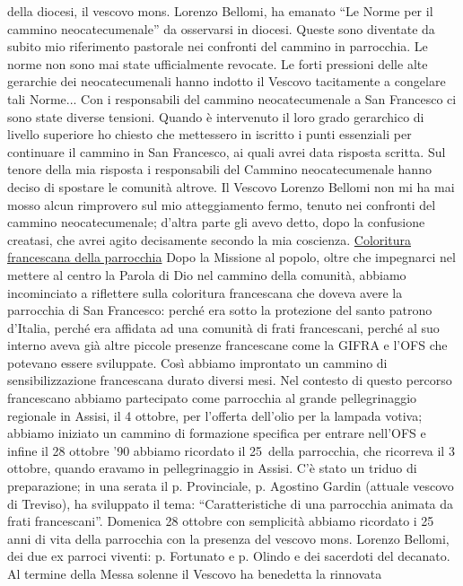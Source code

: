 della diocesi, il vescovo mons. Lorenzo Bellomi, ha emanato “Le Norme per il cammino 
neocatecumenale” da osservarsi in diocesi. Queste sono diventate da subito mio riferimento 
pastorale nei confronti del cammino in parrocchia. Le norme non sono mai state ufficialmente 
revocate. Le forti pressioni delle alte gerarchie dei neocatecumenali hanno indotto il Vescovo 
tacitamente a congelare tali Norme...
Con i responsabili del cammino neocatecumenale a San Francesco ci sono state diverse tensioni. 
Quando è intervenuto il loro grado gerarchico di livello superiore ho chiesto che mettessero in 
iscritto i punti essenziali per continuare il cammino in San Francesco, ai quali avrei data risposta 
scritta. Sul tenore della mia risposta i responsabili del Cammino neocatecumenale hanno deciso di 
spostare le comunità altrove. Il Vescovo Lorenzo Bellomi non mi ha mai mosso alcun rimprovero 
sul mio atteggiamento fermo, tenuto nei confronti del cammino neocatecumenale; d'altra parte gli 
avevo detto, dopo la confusione creatasi, che avrei agito decisamente secondo la mia coscienza.
\bigbreak
{}
\underline{Coloritura francescana della parrocchia}
\medbreak
Dopo la Missione al popolo, oltre che impegnarci nel mettere al centro la Parola di Dio nel 
cammino della comunità, abbiamo incominciato a riflettere sulla coloritura francescana che doveva 
avere la parrocchia di San Francesco: perché era sotto la protezione del santo patrono d'Italia,  
perché era affidata ad una comunità di frati francescani, perché al suo interno aveva già altre piccole 
presenze francescane come la GIFRA e l'OFS che potevano essere sviluppate. Così abbiamo 
improntato un cammino di sensibilizzazione francescana durato diversi mesi. Nel contesto di questo 
percorso francescano abbiamo partecipato come parrocchia al grande pellegrinaggio regionale in 
Assisi, il 4 ottobre, per l'offerta dell'olio per la lampada votiva; abbiamo iniziato un cammino di 
formazione specifica per entrare nell'OFS e infine il 28 ottobre '90 abbiamo ricordato il 25\textdegree\ della 
parrocchia, che ricorreva il 3 ottobre, quando eravamo in pellegrinaggio in Assisi. 
C'è stato un triduo di preparazione; in una serata il p. Provinciale, p. Agostino Gardin 
(attuale vescovo di Treviso), ha sviluppato il tema: “Caratteristiche di una parrocchia animata da 
frati francescani”. 
Domenica 28 ottobre con semplicità abbiamo ricordato i 25 anni di vita della parrocchia con la 
presenza del vescovo mons. Lorenzo Bellomi, dei due ex parroci viventi: p. Fortunato e p. Olindo e 
dei sacerdoti del decanato. Al termine della Messa solenne il Vescovo ha benedetta la rinnovata 
